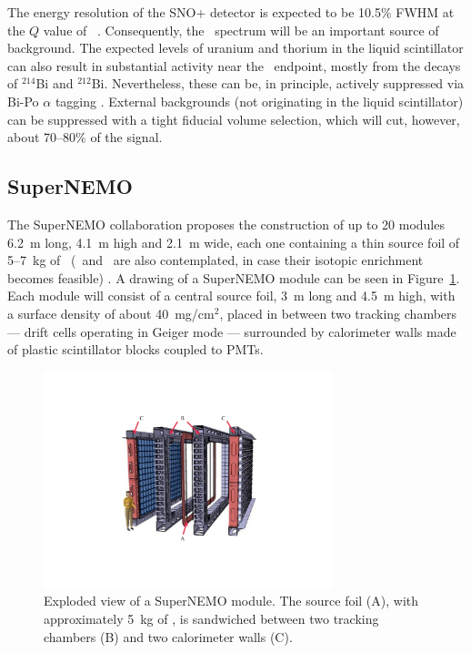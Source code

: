 \documentclass{PoS}
\begin{document}
The energy resolution of the SNO+ detector is expected to be 10.5\% FWHM at the $Q$ value of \TE\ \cite{Biller:2014eha}. Consequently, the \bbtnu\ spectrum will be an important source of background. The expected levels of uranium and thorium in the liquid scintillator can also result in substantial activity near the \bbonu\ endpoint, mostly from the decays of $^{214}$Bi and $^{212}$Bi. Nevertheless, these can be, in principle, actively suppressed via Bi-Po $\alpha$ tagging \cite{Biller:2014eha}. External backgrounds (not originating in the liquid scintillator) can be suppressed with a tight fiducial volume selection, which will cut, however, about 70--80\% of the signal. 

\subsection{SuperNEMO} \label{subsec:SuperNEMO}
The SuperNEMO collaboration proposes the construction of up to 20 modules 6.2~m long, 4.1~m high and 2.1~m wide, each one containing a thin source foil of 5--7~kg of \SE\ (\ND\ and \CA\ are also contemplated, in case their isotopic enrichment becomes feasible) \cite{Lang:2013fta}. A drawing of a SuperNEMO module can be seen in Figure~\ref{fig:SuperNEMO}. Each module will consist of a central source foil, 3~m long and 4.5~m high, with a surface density of about 40~mg/cm$^{2}$, placed in between two tracking chambers --- drift cells operating in Geiger mode --- surrounded by calorimeter walls made of plastic scintillator blocks coupled to PMTs.

\begin{figure}
\centering
\includegraphics[trim=220 155 220 155, clip, width=0.75\textwidth]{img/SuperNEMO.pdf}
\caption{Exploded view of a SuperNEMO module. The source foil (A), with approximately 5~kg of \SE, is sandwiched between two tracking chambers (B) and two calorimeter walls (C).} \label{fig:SuperNEMO}
\end{figure}
\end{document}
